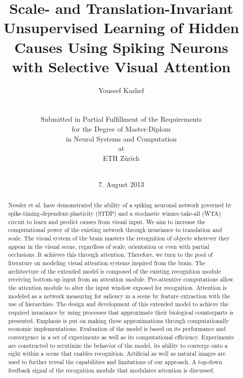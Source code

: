 \documentclass{report}
\begin{document}
\title{Scale- and Translation-Invariant Unsupervised Learning of Hidden Causes Using Spiking Neurons with Selective Visual Attention}
\author{Youssef Kashef\\
\\
\\
Submitted in Partial Fulfillment of the Requirements\\
for the Degree of Master-Diplom\\
in Neural Systems and Computation\\
at\\
ETH Z{\"u}rich\\
\\
}
\date{7. August 2013}

\maketitle
\tableofcontents

\begin{abstract}

Nessler et al. have demonstrated the ability of a spiking neuronal network governed by spike-timing-dependent-plasticity (STDP) and a stochastic winner-take-all (WTA) circuit to learn and predict causes from visual input. We aim to increase the computational power of the existing network through invariance to translation and scale. The visual system of the brain masters the recognition of objects wherever they appear in the visual scene, regardless of scale, orientation or even with partial occlusions. It achieves this through attention. Therefore, we turn to the pool of literature on modeling visual attention systems inspired from the brain. The architecture of the extended model is composed of the existing recognition module receiving bottom-up input from an attention module. Pre-attentive computations allow the attention module to alter the input window exposed for recognition. Attention is modeled as a network measuring for saliency in a scene by feature extraction with the use of hierarchies. The design and development of this extended model to achieve the required invariance by using processes that approximate their biological counterparts is presented. Emphasis is put on making these approximations through computationally economic implementations. Evaluation of the model is based on its performance and convergence in a set of experiments as well as its computational efficiency. Experiments are constructed to scrutinize the behavior of the model, its ability to converge onto a sight within a scene that enables recognition. Artificial as well as natural images are used to further reveal the capabilities and limitations of our approach. A top-down feedback signal of the recognition module that modulates attention is discussed.

\end{abstract}
\end{document}
